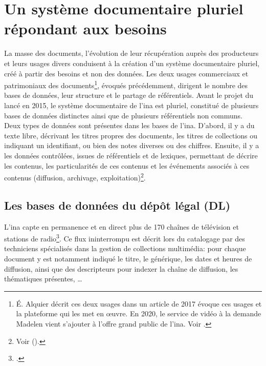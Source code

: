 \section{\label{I-B-2}Un système documentaire pluriel répondant aux besoins}

La masse des documents, l'évolution de leur récupération auprès des producteurs et leurs usages divers conduisent à la création d'un système documentaire pluriel, créé à partir des besoins et non des données. Les deux usages commerciaux et patrimoniaux des documents\footnote{É. Alquier décrit ces deux usages dans un article de 2017 évoque ces usages et la plateforme qui les met en œuvre. En 2020, le service de vidéo à la demande Madelen vient s'ajouter à l'offre \og grand public\fg{} de l'\ac{ina}. Voir \cite{alquier_production_2017}.}, évoqués précédemment, dirigent le nombre des bases de données, leur structure et le partage de référentiels. Avant le projet du \ldd lancé en 2015, le système documentaire de l'\ac{ina} est pluriel, constitué de plusieurs bases de données distinctes ainsi que de plusieurs référentiels non communs.\\

Deux types de données sont présentes dans les bases de l'\ac{ina}. D'abord, il y a du texte libre, décrivant les titres propres des documents, les titres de collections ou indiquant un identifiant, ou bien des notes diverses ou des chiffres. Ensuite, il y a les données contrôlées, issues de référentiels et de lexiques, permettant de décrire les contenus, les particularités de ces contenus et les événements associés à ces contenus (diffusion, archivage, exploitation)\footnote{Voir  ().}.

\subsection{\label{I-B-2-a}Les bases de données du dépôt légal (DL)}

L'\ac{ina} capte en permanence et en direct plus de 170 chaînes de télévision et stations de radio\footcite[p.5]{institut_national_de_laudiovisuel_rapport_2019}. Ce flux ininterrompu est décrit lors du catalogage par des techniciens spécialisés dans la gestion de collections multimédia: pour chaque document y est notamment indiqué le titre, le générique, les dates et heures de diffusion, ainsi que des descripteurs pour indexer la chaîne de diffusion, les thématiques présentes, \dots\\

